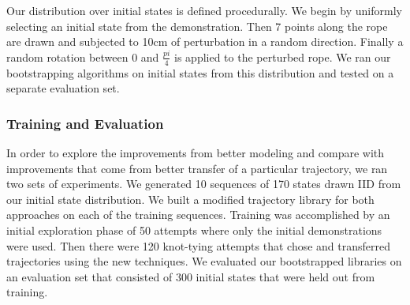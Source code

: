Our distribution over initial states is defined procedurally. We begin by uniformly
selecting an initial state from the demonstration. Then 7 points along the rope are 
drawn and subjected to 10cm of perturbation in a random direction. Finally a random
rotation between 0 and $\frac{pi}{4}$ is applied to the perturbed rope. We ran our
bootstrapping algorithms on initial states from this distribution and tested on a 
separate evaluation set.

\subsubsection{Training and Evaluation}
In order to explore the improvements from better modeling and compare with improvements
that come from better transfer of a particular trajectory, we ran two sets of experiments.
We generated 10 sequences of 170 states drawn IID from our initial state distribution.
We built a modified trajectory library for both approaches on each of the training sequences.
Training was accomplished by an initial exploration phase of 50 attempts where only the initial
demonstrations were used. Then there were 120 knot-tying attempts that chose and transferred
trajectories using the new techniques. We evaluated our bootstrapped libraries on an evaluation
set that consisted of 300 initial states that were held out from training.
